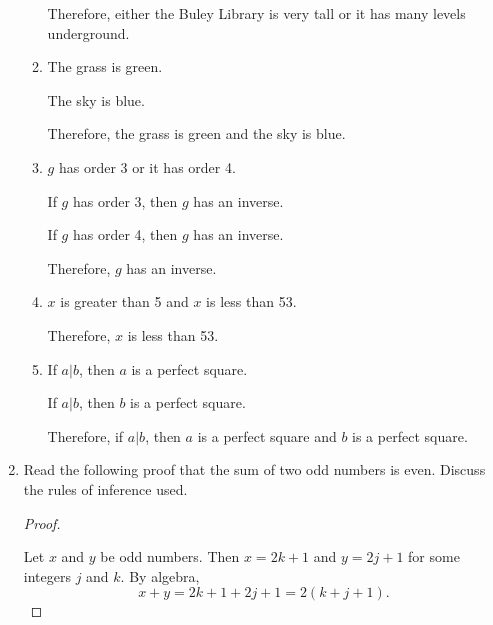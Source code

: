 \documentclass[10pt,]{book}
\theoremstyle{plain}
\theoremstyle{definition}
\theoremstyle{definition}
\numberwithin{equation}{section}
\newcommand{\hint}[1]{ }
\begin{document}
\begin{enumerate}[label=(\alph*)]
\begin{enumerate}[label=\roman*.]
          Therefore, either the Buley Library is very tall or it has many
          levels underground.

          \hint{disjunctive addition}
\item\hypertarget{li-217}{}
          The grass is green.

          The sky is blue.

          Therefore, the grass is green and the sky is blue.

          \hint{conjunctive addition}
\item\hypertarget{li-218}{}
          \(g\) has order 3 or it has order 4.

          If \(g\) has order 3, then \(g\) has an inverse.

          If \(g\) has order 4, then \(g\) has an inverse.

          Therefore, \(g\) has an inverse.

          \hint{constructive dilemma}
\item\hypertarget{li-219}{}
          \(x\) is greater than 5 and \(x\) is less than 53.

          Therefore, \(x\) is less than 53.

          \hint{conjunctive simplification}
\item\hypertarget{li-220}{}
          If \(a|b\), then \(a\) is a perfect square.

          If \(a|b\), then \(b\) is a perfect square.

          Therefore, if \(a|b\), then \(a\) is a perfect square and \(b\) is
          a perfect square.

          \hint{Note that the conclusion could be re-expressed as the conjunction of the two conditionals that
          are found in the premises.  This is conjunctive addition with a bit of ``window dressing.''}
\end{enumerate}

\item\hypertarget{li-221}{}
      Read the following proof that the sum of two odd numbers is even.
      Discuss the rules of inference used.

      \begin{proof}\hypertarget{proof-6}{}

          Let \(x\) and \(y\) be odd numbers. Then \(x=2k+1\)
          and \(y=2j+1\) for some integers \(j\) and \(k\). By algebra,
          \begin{equation*}
            x+y = 2k+1 + 2j+1 = 2(k+j+1).
          \end{equation*}
\par


\end{proof}
\end{enumerate}
\end{document}
